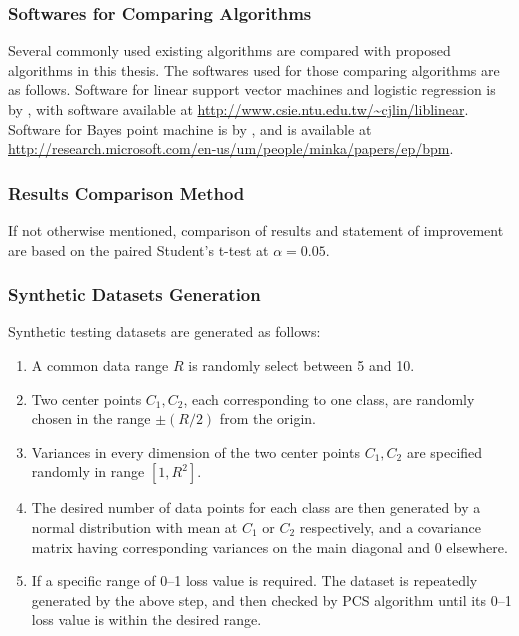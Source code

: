 \subsubsection{Softwares for Comparing Algorithms}

Several commonly used existing algorithms are compared with proposed algorithms in this thesis. The softwares used for those comparing algorithms are as follows. Software for linear support vector machines and logistic regression is by \cite{linearSVM}, with software available at \url{http://www.csie.ntu.edu.tw/~cjlin/liblinear}. Software for Bayes point machine is by \cite{bpm}, and is available at \url{http://research.microsoft.com/en-us/um/people/minka/papers/ep/bpm}.

\subsubsection{Results Comparison Method}

If not otherwise mentioned, comparison of results and statement of improvement are based on the paired Student's t-test at $\alpha = 0.05$.  

\subsubsection{Synthetic Datasets Generation}

Synthetic testing datasets are generated as follows: 
\begin{enumerate}
  \setlength{\itemsep}{4pt}
  \setlength{\parskip}{1pt}
  \setlength{\parsep}{1pt}
	\item A common data range $R$ is randomly select between 5 and 10. 
	\item Two center points $C_1, C_2$, each corresponding to one class, are randomly chosen in the range $\pm (R/2)$ from the origin. 
	\item Variances in every dimension of the two center points $C_1, C_2$ are specified randomly in range $[1, R^2]$. 
	\item The desired number of data points for each class are then generated by a normal distribution with mean at $C_1$ or $C_2$ respectively, and a covariance matrix having corresponding variances on the main diagonal and 0 elsewhere.     
	\item If a specific range of 0--1 loss value is required. The dataset is repeatedly generated by the above step, and then checked by PCS algorithm until its 0--1 loss value is within the desired range.
\end{enumerate}

